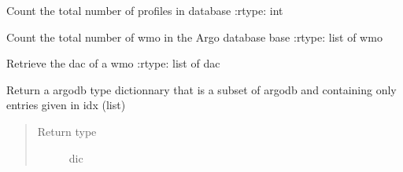 \documentclass[letterpaper,10pt,english]{sphinxmanual}
\begin{document}

\begin{fulllineitems}
\label{\detokenize{pargopy:pargopy.argotools.count_profiles_in_database}}
Count the total number of profiles in database
:rtype: int

\end{fulllineitems}


\begin{fulllineitems}
\label{\detokenize{pargopy:pargopy.argotools.count_wmos}}
Count the total number of wmo in the Argo database base
:rtype: list of wmo

\end{fulllineitems}


\begin{fulllineitems}
\label{\detokenize{pargopy:pargopy.argotools.dac_from_wmo}}
Retrieve the dac of a wmo
:rtype: list of dac

\end{fulllineitems}


\begin{fulllineitems}
\label{\detokenize{pargopy:pargopy.argotools.extract_idx_from_argodb}}
Return a argodb type dictionnary that is a subset of argodb and
containing only entries given in idx (list)
\begin{quote}\begin{description}
\item[{Return type}] \leavevmode
dic

\end{description}\end{quote}

\end{fulllineitems}
\end{document}
